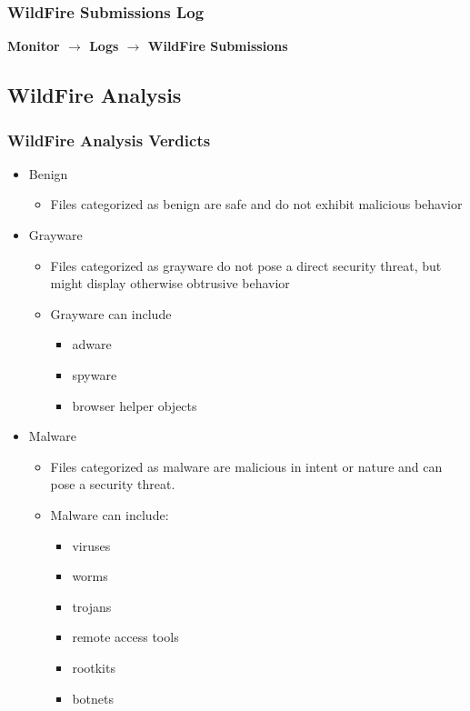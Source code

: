 \subsubsection{WildFire Submissions Log}
\textbf{Monitor $\rightarrow$ Logs $\rightarrow$ WildFire Submissions}

\subsection{WildFire Analysis}
\subsubsection{WildFire Analysis Verdicts}
    \begin{itemize}
        \item Benign
            \begin{itemize}
                \item Files categorized as benign are safe and do not exhibit malicious behavior
            \end{itemize}
        \item Grayware
            \begin{itemize}
                \item Files categorized as grayware do not pose a direct security threat, but might display otherwise obtrusive behavior
                \item Grayware can include
                    \begin{itemize}
                        \item adware
                        \item spyware
                        \item browser helper objects
                    \end{itemize}
            \end{itemize}
        \item Malware
            \begin{itemize}
                \item Files categorized as malware are malicious in intent or nature and can pose a security threat.
                \item Malware can include:
                    \begin{itemize}
                        \item viruses
                        \item worms
                        \item trojans
                        \item remote access tools
                        \item rootkits
                        \item botnets
                    \end{itemize}
            \end{itemize}
    \end{itemize}


